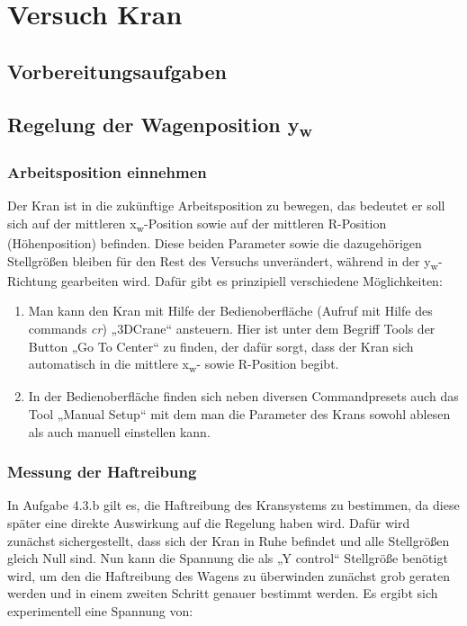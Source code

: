 \documentclass[10pt]{scrartcl}
\begin{document}
\section{Versuch Kran}
\subsection{Vorbereitungsaufgaben}
\subsection{Regelung der Wagenposition y\textsubscript{w}}
\subsubsection {Arbeitsposition einnehmen}
Der Kran ist in die zukünftige Arbeitsposition zu bewegen, das bedeutet er soll sich auf der mittleren x\textsubscript{w}-Position sowie auf der mittleren R-Position (Höhenposition) befinden. Diese beiden Parameter sowie die dazugehörigen Stellgrößen bleiben für den Rest des Versuchs unverändert, während in der y\textsubscript{w}-Richtung gearbeiten wird. 
Dafür gibt es prinzipiell verschiedene Möglichkeiten:

\begin{enumerate}
\item Man kann den Kran mit Hilfe der Bedienoberfläche (Aufruf mit Hilfe des commands \textit{cr}) „3DCrane“ ansteuern. Hier ist unter dem Begriff Tools der Button „Go To Center“ zu finden, der dafür sorgt, dass der Kran sich automatisch in die mittlere x\textsubscript{w}- sowie R-Position begibt.
\item In der Bedienoberfläche finden sich neben diversen Commandpresets auch das Tool „Manual Setup“ mit dem man die Parameter des Krans sowohl ablesen als auch manuell einstellen kann.
\end{enumerate}


\subsubsection {Messung der Haftreibung}

In Aufgabe 4.3.b gilt es, die Haftreibung des Kransystems zu bestimmen, da diese später eine direkte Auswirkung auf die Regelung haben wird. Dafür wird  zunächst sichergestellt, dass sich der Kran in Ruhe befindet und alle Stellgrößen gleich Null sind. Nun kann die Spannung die als „Y control“ Stellgröße benötigt wird, um den die Haftreibung des Wagens zu überwinden zunächst grob geraten werden und in einem zweiten Schritt genauer bestimmt werden. Es ergibt sich experimentell eine Spannung von:
\end{document}
